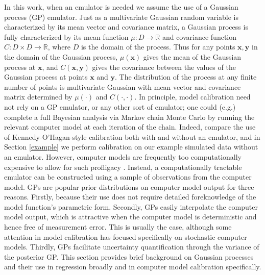 \documentclass[12pt]{article}
\begin{document}
In this work, when an emulator is needed we assume the use of a Gaussian process (GP) emulator.
%
Just as a multivariate Gaussian random variable is characterized by its mean vector and covariance matrix, a Gaussian process is fully characterized by its mean function $\mu:D\to \mathbb R$ and covariance function $C:D\times D\to \mathbb R$, where $D$ is the domain of the process. 
%
Thus for any points $\mathbf x,\mathbf y$ in the domain of the Gaussian process, $\mu(\mathbf x)$ gives the mean of the Gaussian process at $\mathbf x$, and $C(\mathbf x, \mathbf y)$ gives the covariance between the values of the Gaussian process at points $\mathbf x$ and $\mathbf y$.
%
The distribution of the process at any finite number of points is multivariate Gaussian with mean vector and covariance matrix determined by $\mu(\cdot)$ and $C(\cdot,\cdot)$.
%
In principle, model calibration need not rely on a GP emulator, or any other sort of emulator; one could (e.g.) complete a full Bayesian analysis via Markov chain Monte Carlo \citep[MCMC;][]{Gelfand1990} by running the relevant computer model at each iteration of the chain. 
%
Indeed, \cite{Hemez2011} compare the use of Kennedy-O'Hagan-style calibration both with and without an emulator, and in Section \ref{example} we perform calibration on our example simulated data without an emulator.
%
However, computer models are frequently too computationally expensive to allow for such profligacy \citep{VanBuren2013,VanBuren2014}.
%
Instead, a computationally tractable emulator can be constructed using a sample of observations from the computer model. 
%
GPs are popular prior distributions on computer model output for three reasons.
%
Firstly, because their use does not require detailed foreknowledge of the model function's parametric form. 
%
Secondly, GPs easily interpolate the computer model output, which is attractive when the computer model is deterministic and hence free of measurement error. 
%
This is usually the case, although some attention in model calibration \citep[e.g.][]{Pratola2018} has focused specifically on stochastic computer models. 
%
Thirdly, GPs facilitate uncertainty quantification through the variance of the posterior GP. 
%
This section provides brief background on Gaussian processes and their use in regression broadly and in computer model calibration specifically.
%
\end{document}
